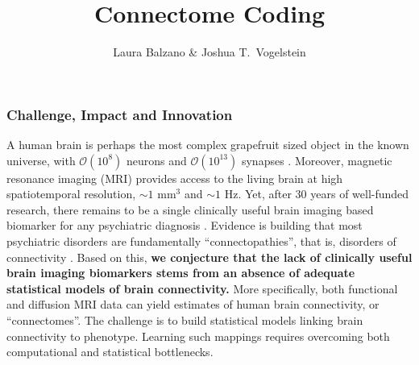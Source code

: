 \documentclass[times,11pt]{article} %
\begin{document}
%
\title{\vspace{-50pt}Connectome Coding}

\author{Laura Balzano \& Joshua T.~Vogelstein}
\date{}
\def \E{\mathbb E}
\def \Expect{\mathbb E}
\def \1{\mathbf 1}
\def \P{\mathrm{Pr}}
\def \R{\mathbb{R}}
\def \S{\mathcal{S}}
\def \cA{\mathcal{A}}
\def \N{p}
\def \reals{\mathbb{R}}
\newcommand{\deq}{\mathrel{\stackrel{\scriptscriptstyle\Delta}{=}}}


\newenvironment{squishlist}
{   \begin{list}{$\bullet$}
    { \setlength{\itemsep}{2pt}      \setlength{\parsep}{2pt}
      \setlength{\topsep}{0pt}       \setlength{\partopsep}{0pt}
      \setlength{\leftmargin}{1.5em} \setlength{\labelwidth}{1em}
      \setlength{\labelsep}{0.5em} } }
      {\end{list}}
      
\newenvironment{squishlist2}
{   \begin{list}{$\blacktriangleright$}
    { \setlength{\itemsep}{2pt}      \setlength{\parsep}{2pt}
      \setlength{\topsep}{0pt}       \setlength{\partopsep}{0pt}
      \setlength{\leftmargin}{1.5em} \setlength{\labelwidth}{1em}
      \setlength{\labelsep}{0.5em} } }
      {\end{list}}



\renewcommand\thepage{C-1}


\maketitle

\subsubsection*{Challenge, Impact and Innovation}

A human brain is perhaps the most complex grapefruit sized object in the known universe, with $\mathcal{O}(10^8)$ neurons and $\mathcal{O}(10^{13})$ synapses \cite{??}.   Moreover,  magnetic resonance imaging (MRI) provides access to the living brain at high spatiotemporal resolution, $\sim$$1$ mm$^3$ and $\sim$$1$ Hz.  Yet, after 30 years of well-funded research, there remains to be a single clinically useful brain imaging based biomarker for any psychiatric diagnosis \cite{APA}. 
% 
Evidence is building that most psychiatric disorders are fundamentally ``connectopathies'', that is, disorders of connectivity \cite{??}. Based on this, 
\textbf{we conjecture that the lack of clinically useful brain imaging biomarkers stems from an absence of adequate statistical models of brain connectivity.} More specifically, both functional and diffusion MRI data can yield estimates of human brain connectivity, or ``connectomes''.  The challenge is to build statistical models linking brain connectivity to phenotype.  Learning such mappings requires overcoming both computational and statistical bottlenecks.
\end{document}
